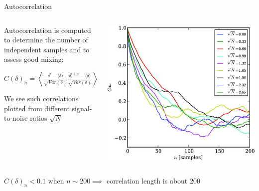 \documentclass[10pt]{beamer}
\begin{document}
\begin{frame}[fragile]{Autocorrelation}


   \begin{columns}
   
        \begin{column}{0.7\textwidth} %
        Autocorrelation is computed to determine the number of independent samples and to assess good mixing:
        \begin{center}
        \begingroup\makeatletter{}\check@mathfonts

$C(\delta)_n=\left\langle\frac{\delta^i-\langle\delta\rangle}{\sqrt{Var\left(\delta\right)}}\frac{\delta^{i+n}-\langle\delta\rangle}{\sqrt{Var\left(\delta\right)}}\right\rangle$
\end{center}
\endgroup\pause
We see such correlations plotted from different signal-to-noise ratios $\sqrt{N}$
        \end{column}
        \begin{column}{0.4\textwidth} %
            \includegraphics[width=\textwidth]{stt449fig4.jpeg}
        \end{column}
    \end{columns}
    \begin{center}
    $C(\delta)_n < 0.1$ when $n\sim200 \implies$ correlation length is about $200$
    \end{center}
\end{frame}
\end{document}
